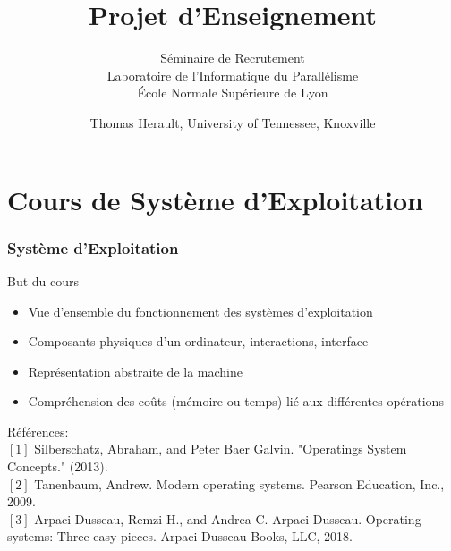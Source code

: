\documentclass[compress,aspectratio=169]{beamer}
\title[Rencontre avec le DI]{Projet d'Enseignement}
\subtitle{S\'eminaire de Recrutement\\
  Laboratoire de l'Informatique du Parall\'elisme\\
  \'Ecole Normale Sup\'erieure de Lyon}
\author[herault@icl.utk.edu]{Thomas Herault, University of Tennessee, Knoxville}
\date[13 Mai 2024]{}
\begin{document}
\begin{frame}
  \titlepage
\end{frame}

\section{Cours de Syst\`eme d'Exploitation}

\begin{frame}
  \frametitle{Syst\`eme d'Exploitation}

  \begin{beamerboxesrounded}{But du cours}
    \begin{itemize}
    \item Vue d'ensemble du fonctionnement des syst\`emes d'exploitation
    \item Composants physiques d'un ordinateur, interactions, interface
    \item Repr\'esentation abstraite de la machine
    \item Compr\'ehension des co\^uts (m\'emoire ou temps) li\'e aux diff\'erentes op\'erations 
    \end{itemize}
  \end{beamerboxesrounded}

  \bigskip
  
  \small R\'ef\'erences:\\
  $[1]$ Silberschatz, Abraham, and Peter Baer Galvin. "Operatings System Concepts." (2013).\\
  $[2]$ Tanenbaum, Andrew. Modern operating systems. Pearson Education, Inc., 2009.\\
  $[3]$ Arpaci-Dusseau, Remzi H., and Andrea C. Arpaci-Dusseau. Operating systems: Three easy pieces. Arpaci-Dusseau Books, LLC, 2018.
  
\end{frame}
\end{document}
